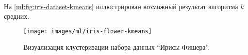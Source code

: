 На \autoref{ml:fig:iris-dataset-kmeans} иллюстрирован возможный результат алгоритма $k$ средних.

\IfNotDraft
{
\begin{figure}[tb]
  \begin{center}
    \leavevmode
    \texttt{[image: images/ml/iris-flower-kmeans]}
  \end{center}
  \caption{Визуализация клустеризации набора данных ``Ирисы Фишера''.}
  \label{ml:fig:iris-dataset-kmeans}
\end{figure}
}
